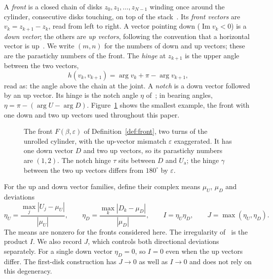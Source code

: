 \documentclass[11pt]{amsart}
\theoremstyle{definition}
\newcommand{\eps}{\varepsilon}
\newcommand{\Ua}{U_{\mathrm a}}
\DeclareMathOperator{\Imag}{Im}
\begin{document}
A \emph{front} is a closed chain of disks $z_0,z_1,\dots,z_{N-1}$ winding once around the cylinder,
consecutive disks touching, on top of the stack~\cite{AtelaGole,GD}. Its \emph{front vectors} are
$v_k=z_{k+1}-z_k$, read from left to right. A vector pointing down ($\Imag v_k<0$) is a \emph{down
vector}; the others are \emph{up vectors}, following the convention that a horizontal vector is
up~\cite{GDD}. We write $(m,n)$ for the numbers of down and up vectors; these are the parastichy
numbers of the front. The \emph{hinge} at $z_{k+1}$ is the upper angle between the two vectors,
\begin{equation}\label{eq:hinge}
h(v_k,v_{k+1})=\arg v_k+\pi-\arg v_{k+1},
\end{equation}
read as: the angle above the chain at the joint. A \emph{notch} is a down vector followed by an up
vector. Its hinge is the notch angle $\eta$ of~\cite{GDD}; in bearing angles,
$\eta=\pi-(\arg U-\arg D)$. Figure~\ref{fig:front} shows the smallest example, the front with one down
and two up vectors used throughout this paper.

\begin{figure}[t]
\centering
\begin{tikzpicture}[x=1.35cm,y=1.35cm,every node/.style={font=\small}]

\end{tikzpicture}
\caption{The front $F(\beta,\eps)$ of Definition~\ref{def:front}, two turns of the unrolled cylinder,
with the up-vector mismatch $\eps$ exaggerated. It has one down vector $D$ and two up vectors, so its
parastichy numbers are $(1,2)$. The notch hinge $\tau$ sits between $D$ and $\Ua$; the hinge $\gamma$
between the two up vectors differs from $180^\circ$ by $\eps$.}\label{fig:front}
\end{figure}

For the up and down vector families, define their complex means $\mu_U$, $\mu_D$ and deviations
\begin{equation}\label{eq:irregularity}
\eta_U=\frac{\max_j|U_j-\mu_U|}{|\mu_U|},\qquad
\eta_D=\frac{\max_k|D_k-\mu_D|}{|\mu_D|},\qquad
I=\eta_U\eta_D,\qquad J=\max(\eta_U,\eta_D).
\end{equation}
The means are nonzero for the fronts considered here. The irregularity of~\cite{GDD} is the
product $I$. We also record $J$, which controls both directional deviations separately.
For a single down vector $\eta_D=0$, so $I=0$ even when the up vectors differ. The first-disk
construction has $J\to0$ as well as $I\to0$ and does not rely on this degeneracy.
\end{document}
